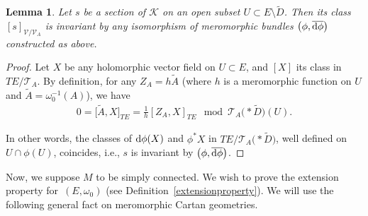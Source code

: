 \documentclass[pdftex]{sigma}
\numberwithin{equation}{section}
\newtheorem{Lemma}[Theorem]{Lemma}
\begin{document}
\begin{Lemma}\label{killBott} Let $s$ be a section of $\mathcal{K}$ on an open subset $U\subset E\setminus \tilde{D}$. Then its class $[s]_{\mathcal{V}/\mathcal{V}_A}$ is invariant by any isomorphism of meromorphic bundles $\big(\phi,\overline{{\rm d}\phi}\big)$ constructed as above. \end{Lemma}
\begin{proof} Let $X$ be any holomorphic vector field on $U\subset E$, and $[X]$ its class in $TE/\mathcal{T}_A$. By definition, for any $Z_A = h \tilde{A}$ (where $h$ is a meromorphic function on $U$ and $\tilde{A}=\omega_0^{-1}(A)$), we have
\begin{align*}
 0 = \big[\tilde{A},X\big]_{TE} = \frac{1}{h}[Z_A,X]_{TE} \mod \mathcal{T}_A\bigl(* \tilde{D}\bigr)(U).
 \end{align*}

In other words, the classes of ${\rm d}\phi(X)$ and $\phi^* X$ in $TE/\mathcal{T}_A\bigl(* \tilde{D}\bigr)$, well defined on $U\cap \phi(U)$, coincides, i.e., $s$ is invariant by $\big(\phi,\overline{{\rm d}\phi}\big)$. \end{proof}

Now, we suppose $M$ to be simply connected. We wish to prove the extension property for~$(E,\omega_0)$ (see Definition~\ref{extensionproperty}). We will use the following general fact on meromorphic Cartan geometries.
\end{document}
